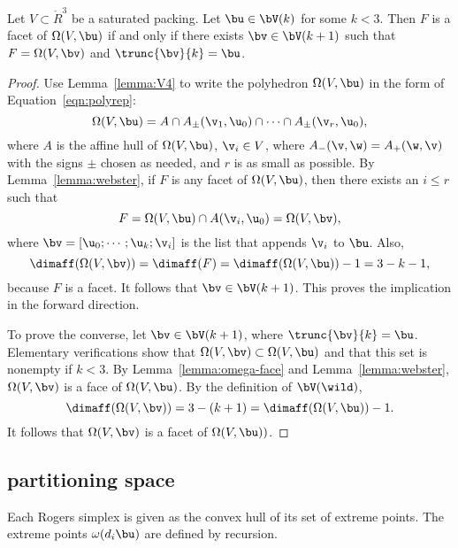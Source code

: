 \begin{lemma}[facets]\label{lemma:omega-facet} 
  Let $V\subset\ring{R}^3$ be a saturated packing.  Let $\bu\in
  \bV(k)$ for some $k<3$.  Then $F$ is a facet of $\Omega(V,\bu)$ if
  and only if there exists $\bv\in \bV(k+1)$ such that $F =
  \Omega(V,\bv)$ and $\trunc{\bv}{k} = \bu$.
\end{lemma}

\begin{proof} 
  Use Lemma~\ref{lemma:V4} to write the polyhedron $\Omega(V,\bu)$ in
  the form of Equation~\ref{eqn:polyrep}:
\[  
\Omega(V,\bu) = A \cap A_\pm(\v_1,\u_0) \cap \cdots\cap A_\pm(\v_r,\u_0),
\] 
where $A$ is the affine hull of $\Omega(V,\bu)$, $\v_i\in V$, where
$A_-(\v,\w) = A_+(\w,\v)$ with the signs $\pm$ chosen as needed, and
$r$ is as small as possible.  By Lemma~\ref{lemma:webster}, if $F$ is
any facet of $\Omega(V,\bu)$, then there exists an $i\le r$ such that
\[  
F = \Omega(V,\bu) \cap A(\v_i,\u_0) = \Omega(V,\bv),
\] 
where $\bv = [\u_0;\cdots;\u_k;\v_i]$ is the list that appends $\v_i$
to $\bu$.  Also,
\[  
\dimaff(\Omega(V,\bv)) = \dimaff(F) = \dimaff(\Omega(V,\bu)) - 1 = 3 - k - 1,
\] 
because $F$ is a facet.  It follows that $\bv \in \bV(k+1)$.  This
proves the implication in the forward direction.

To prove the converse, let $\bv\in \bV(k+1)$, where $\trunc{\bv}{k} =
\bu$.  Elementary verifications show that $\Omega(V,\bv)\subset
\Omega(V,\bu)$ and that this set is nonempty if $k<3$.  By
Lemma~\ref{lemma:omega-face} and Lemma~\ref{lemma:webster},
$\Omega(V,\bv)$ is a face of $\Omega(V,\bu)$.  By the definition of
$\bV(\wild )$,
\[  
\dimaff(\Omega(V,\bv)) = 3 - (k+1) = \dimaff(\Omega(V,\bu)) -1.
\] 
It follows that $\Omega(V,\bv)$ is a facet of $\Omega(V,\bu))$.
\end{proof}


\subsection{partitioning space}

Each Rogers simplex is given as the convex hull of  its set of extreme points.  
The extreme points $\omega(d_i\bu)$
are defined by recursion.

